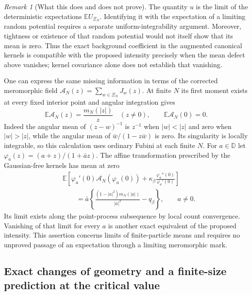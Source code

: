 \documentclass[11pt,a4paper]{article}
\numberwithin{equation}{section}
\theoremstyle{definition}
\theoremstyle{remark}
\newtheorem{remark}[theorem]{Remark}
\newcommand{\D}{\mathbb D}
\begin{document}
\begin{remark}[What this does and does not prove]
The quantity $u$ is the limit of the deterministic expectations
$\mathbb E U_{\Xi_N}$.  Identifying it with the expectation of a limiting
random potential requires a separate uniform-integrability argument.
Moreover, tightness or existence of that random potential would not
itself show that its mean is zero.  Thus the exact background coefficient
in the augmented canonical kernels is compatible with the proposed
intensity precisely when the mean defect above vanishes; kernel
covariance alone does not establish that vanishing.
\end{remark}

One can express the same missing information in terms of the corrected
meromorphic field
$\mathcal A_N(z)=\sum_{w\in\Xi_N}J_w(z)$.  At finite $N$ its first
moment exists at every fixed interior point and angular integration gives
\begin{equation}
 \mathbb E\mathcal A_N(z)=\frac{m_N(|z|)}z\quad(z\ne0),
 \qquad \mathbb E\mathcal A_N(0)=0.
 \label{eq:mean-corrected-field-radial-count}
\end{equation}
Indeed the angular mean of $(z-w)^{-1}$ is $z^{-1}$ when $|w|<|z|$
and zero when $|w|>|z|$, while the angular mean of
$\bar w/(1-z\bar w)$ is zero.  Its singularity is locally integrable,
so this calculation uses ordinary Fubini at each finite $N$.
For $a\in\D$ let $\varphi_a(z)=(a+z)/(1+\bar a z)$.  The affine
transformation prescribed by the Gaussian-free kernels has mean at zero
\begin{align}
 &\mathbb E\left[
 \varphi_a'(0)\mathcal A_N(\varphi_a(0))
       +\kappa_\beta\frac{\varphi_a''(0)}{\varphi_a'(0)}\right]
 \nonumber\\
 &\hspace{2em}=
 \bar a\left\{\frac{(1-|a|^2)m_N(|a|)}{|a|^2}-q_\beta\right\},
 \qquad a\ne0.
 \label{eq:affine-mean-covariance-defect}
\end{align}
Its limit exists along the point-process subsequence by local count
convergence.  Vanishing of that limit for every $a$ is another exact
equivalent of the proposed intensity.  This assertion concerns limits
of finite-particle means and requires no unproved passage of an
expectation through a limiting meromorphic mark.


\subsection{Exact changes of geometry and a finite-size prediction at the critical value}
\label{subsec:intensity-literature-geometry}
\end{document}
